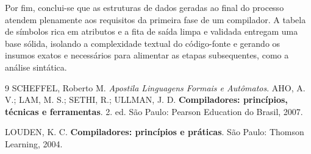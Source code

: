 \documentclass[12pt, a4paper]{article}
\begin{document}
	Por fim, conclui-se que as estruturas de dados geradas ao final do processo atendem plenamente aos requisitos da primeira fase de um compilador. A tabela de símbolos rica em atributos e a fita de saída limpa e validada entregam uma base sólida, isolando a complexidade textual do código-fonte e gerando os insumos exatos e necessários para alimentar as etapas subsequentes, como a análise sintática.

\begin{thebibliography}{9}
 SCHEFFEL, Roberto M.
\textit{Apostila Linguagens Formais e Autômatos}.
AHO, A. V.; LAM, M. S.; SETHI, R.; ULLMAN, J. D. \textbf{Compiladores: princípios, técnicas e ferramentas}. 2. ed. São Paulo: Pearson Education do Brasil, 2007.

LOUDEN, K. C. \textbf{Compiladores: princípios e práticas}. São Paulo: Thomson Learning, 2004.

\end{thebibliography}
\end{document}

